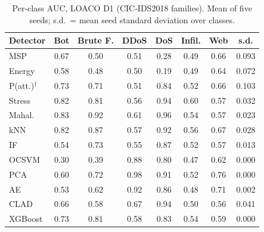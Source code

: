 \begin{table}[!t]
\centering
\scriptsize
\setlength{\tabcolsep}{2.6pt}
\caption{Per-class AUC, LOACO D1 (CIC-IDS2018 families). Mean of five seeds; s.d.\ = mean seed standard deviation over classes.}
\label{tab:a_l1}
\begin{tabular}{lccccccc}
\toprule
Detector & Bot & Brute F. & DDoS & DoS & Infil. & Web & s.d.\\
\midrule
MSP & 0.67 & 0.50 & 0.51 & 0.28 & 0.49 & 0.66 & 0.093\\
Energy & 0.58 & 0.48 & 0.50 & 0.19 & 0.49 & 0.64 & 0.072\\
P(att.)$^\dagger$ & 0.73 & 0.71 & 0.51 & 0.84 & 0.52 & 0.66 & 0.103\\
\midrule
Stress & 0.82 & 0.81 & 0.56 & 0.94 & 0.60 & 0.57 & 0.032\\
Mahal. & 0.83 & 0.92 & 0.61 & 0.96 & 0.54 & 0.57 & 0.023\\
kNN & 0.82 & 0.87 & 0.57 & 0.92 & 0.56 & 0.67 & 0.028\\
\midrule
IF & 0.54 & 0.73 & 0.55 & 0.87 & 0.52 & 0.57 & 0.013\\
OCSVM & 0.30 & 0.39 & 0.88 & 0.80 & 0.47 & 0.62 & 0.000\\
PCA & 0.60 & 0.72 & 0.98 & 0.91 & 0.52 & 0.76 & 0.000\\
AE & 0.53 & 0.62 & 0.92 & 0.86 & 0.48 & 0.71 & 0.002\\
\midrule
CLAD & 0.66 & 0.58 & 0.67 & 0.94 & 0.50 & 0.56 & 0.041\\
\midrule
XGBoost & 0.73 & 0.81 & 0.58 & 0.83 & 0.54 & 0.59 & 0.000\\
\bottomrule
\end{tabular}
\end{table}

